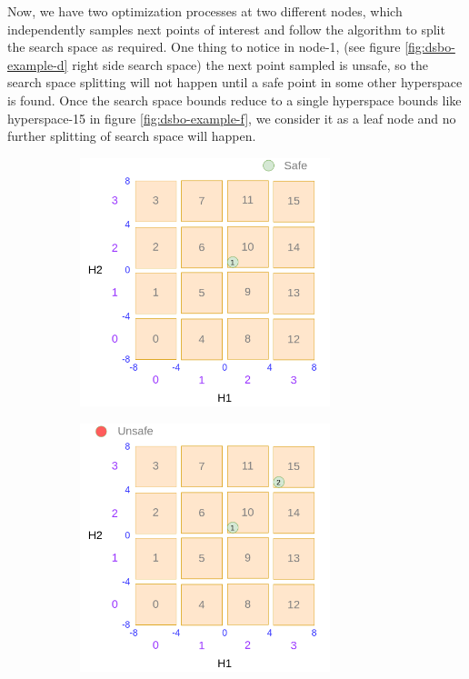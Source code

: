 Now, we have two optimization processes at two different nodes, which independently samples next points of interest and follow the algorithm to split the search space as required.
One thing to notice in node-1, (see figure \ref{fig:dsbo-example-d} right side search space) the next point sampled is unsafe, so the search space splitting will not happen until a safe point in some other hyperspace is found.
Once the search space bounds reduce to a single hyperspace bounds like hyperspace-15 in figure \ref{fig:dsbo-example-f}, we consider it as a leaf node and no further splitting of search space will happen.\\


\begin{figure}
	\centering
	\begin{subfigure}{0.45\textwidth}
		\includegraphics[width=0.8\textwidth]{figures/draw/a.png}
		\caption{}
		\label{fig:dsbo-example-a}
	\end{subfigure}
	\begin{subfigure}{0.45\textwidth}
		\includegraphics[width=0.8\textwidth]{figures/draw/b.png}

\end{subfigure}
\end{figure}

